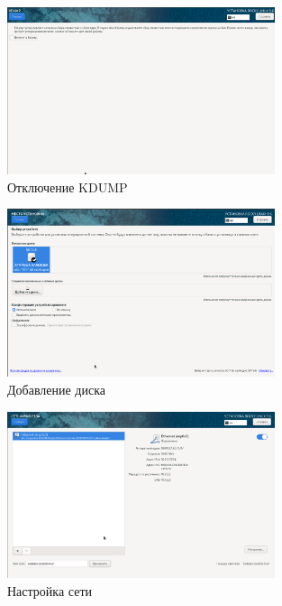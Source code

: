 \documentclass[
  12pt,
  a4paper,
  DIV=11,
  numbers=noendperiod]{scrreprt}
\begin{document}
\begin{figure}

{\centering \includegraphics[width=0.7\textwidth,height=\textheight]{image/7.png}

}

\caption{Отключение KDUMP}

\end{figure}%
\begin{figure}

{\centering \includegraphics[width=0.7\textwidth,height=\textheight]{image/8.png}

}

\caption{Добавление диска}

\end{figure}%
\begin{figure}

{\centering \includegraphics[width=0.7\textwidth,height=\textheight]{image/9.png}

}

\caption{Настройка сети}

\end{figure}%
\end{document}
